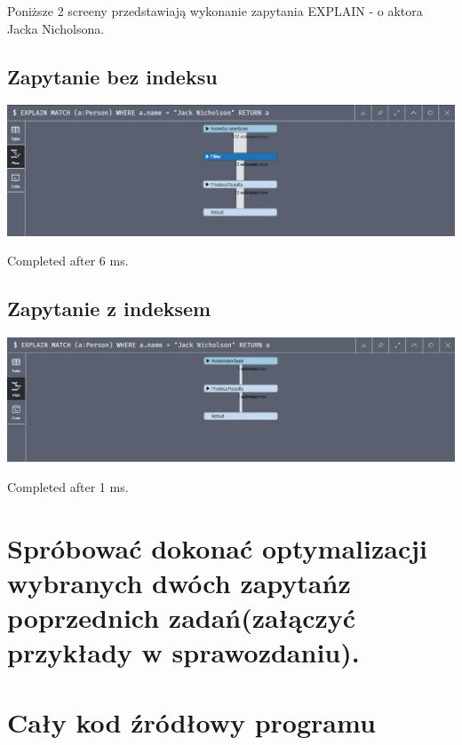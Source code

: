\documentclass[a4paper, 11pt]{article}
\begin{document}
    Poniższe 2 screeny przedstawiają wykonanie zapytania EXPLAIN - o aktora Jacka Nicholsona.

    \subsection{Zapytanie bez indeksu}
    \begin{center}
        \includegraphics[scale=0.65]{images/explain_without_index.png}
    \end{center}

    Completed after 6 ms.

    \subsection{Zapytanie z indeksem}
    \begin{center}
        \includegraphics[scale=0.65]{images/explain_with_index.png}
    \end{center}

    Completed after 1 ms.

    \newpage

    \section{Spróbować dokonać optymalizacji wybranych dwóch zapytańz poprzednich zadań(załączyć
    przykłady w sprawozdaniu).}

    

    \newpage

    \section{Cały kod źródłowy programu}

    
\end{document}
